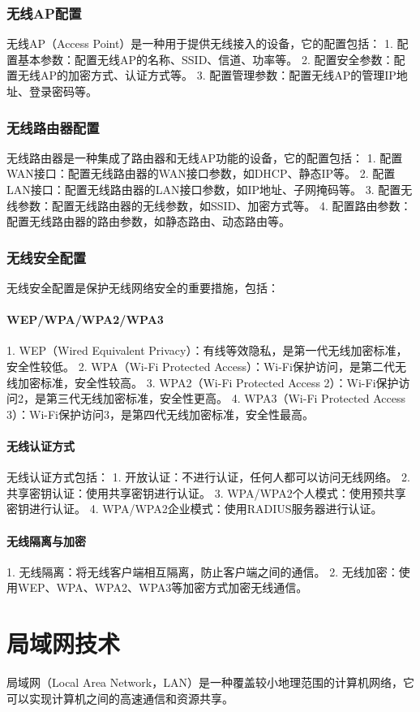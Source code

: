 \documentclass{book}
\begin{document}
\subsection{无线AP配置}
无线AP（Access Point）是一种用于提供无线接入的设备，它的配置包括：
1. 配置基本参数：配置无线AP的名称、SSID、信道、功率等。
2. 配置安全参数：配置无线AP的加密方式、认证方式等。
3. 配置管理参数：配置无线AP的管理IP地址、登录密码等。
\subsection{无线路由器配置}
无线路由器是一种集成了路由器和无线AP功能的设备，它的配置包括：
1. 配置WAN接口：配置无线路由器的WAN接口参数，如DHCP、静态IP等。
2. 配置LAN接口：配置无线路由器的LAN接口参数，如IP地址、子网掩码等。
3. 配置无线参数：配置无线路由器的无线参数，如SSID、加密方式等。
4. 配置路由参数：配置无线路由器的路由参数，如静态路由、动态路由等。
\subsection{无线安全配置}
无线安全配置是保护无线网络安全的重要措施，包括：
\subsubsection{WEP/WPA/WPA2/WPA3}
1. WEP（Wired Equivalent Privacy）：有线等效隐私，是第一代无线加密标准，安全性较低。
2. WPA（Wi-Fi Protected Access）：Wi-Fi保护访问，是第二代无线加密标准，安全性较高。
3. WPA2（Wi-Fi Protected Access 2）：Wi-Fi保护访问2，是第三代无线加密标准，安全性更高。
4. WPA3（Wi-Fi Protected Access 3）：Wi-Fi保护访问3，是第四代无线加密标准，安全性最高。
\subsubsection{无线认证方式}
无线认证方式包括：
1. 开放认证：不进行认证，任何人都可以访问无线网络。
2. 共享密钥认证：使用共享密钥进行认证。
3. WPA/WPA2个人模式：使用预共享密钥进行认证。
4. WPA/WPA2企业模式：使用RADIUS服务器进行认证。
\subsubsection{无线隔离与加密}
1. 无线隔离：将无线客户端相互隔离，防止客户端之间的通信。
2. 无线加密：使用WEP、WPA、WPA2、WPA3等加密方式加密无线通信。

\chapter{局域网技术}
局域网（Local Area Network，LAN）是一种覆盖较小地理范围的计算机网络，它可以实现计算机之间的高速通信和资源共享。
\end{document}
